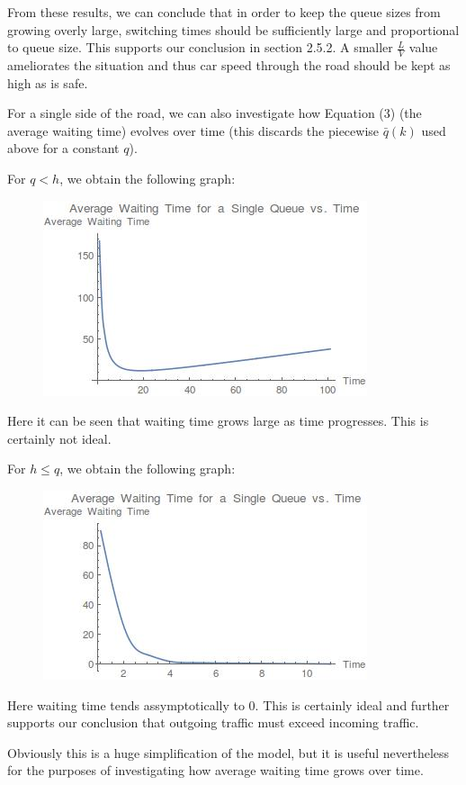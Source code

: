 \documentclass[a4paper]{article}
\begin{document}
From these results, we can conclude that in order to keep the queue sizes from growing overly large, switching times should be sufficiently large and proportional to queue size. This supports our conclusion in section 2.5.2. A smaller $\frac{L}{V}$ value ameliorates the situation and thus car speed through the road should be kept as high as is safe.

For a single side of the road, we can also investigate how  Equation (3) (the average waiting time) evolves over time (this discards the piecewise $\bar{q}(k)$ used above for a constant $q$).

For $q < h$, we obtain the following graph:
\begin{figure}[h]
\centering
\includegraphics[scale=0.5]{WTQLH.jpg}
\end{figure}
Here it can be seen that waiting time grows large as time progresses. This is certainly not ideal.

For $h \leq q$, we obtain the following graph:
\begin{figure}[h]
\centering
\includegraphics[scale=0.5]{WTHLQ.jpg}
\end{figure}
Here waiting time tends assymptotically to 0. This is certainly ideal and further supports our conclusion that outgoing traffic must exceed incoming traffic. 

Obviously this is a huge simplification of the model, but it is useful nevertheless for the purposes of investigating how average waiting time grows over time.
\end{document}
